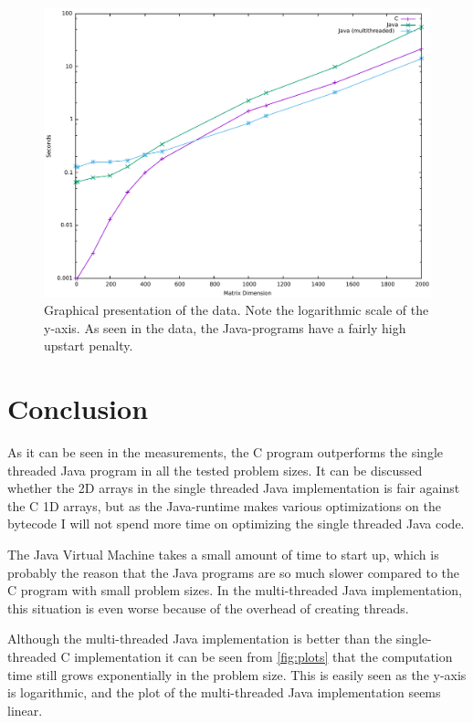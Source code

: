 \documentclass{article}
\begin{document}
	\begin{figure}[H]
		\includegraphics[width=\textwidth]{AppliedAlgorithmsMatrixMultiplicationPlots.pdf}
		\caption{Graphical presentation of the data. Note the logarithmic scale of the y-axis. As seen in the data, the Java-programs have a fairly high upstart penalty.}
		\label{fig:plots}
	\end{figure}

	\section{Conclusion}
	As it can be seen in the measurements, the C program outperforms the single threaded Java program in all the tested problem sizes. It can be discussed whether the 2D arrays in the single threaded Java implementation is fair against the C 1D arrays, but as the Java-runtime makes various optimizations on the bytecode I will not spend more time on optimizing the single threaded Java code.
	
	The Java Virtual Machine takes a small amount of time to start up, which is probably the reason that the Java programs are so much slower compared to the C program with small problem sizes. In the multi-threaded Java implementation, this situation is even worse because of the overhead of creating threads.

	Although the multi-threaded Java implementation is better than the single-threaded C implementation it can be seen from \autoref{fig:plots} that the computation time still grows exponentially in the problem size. This is easily seen as the y-axis is logarithmic, and the plot of the multi-threaded Java implementation seems linear.
\end{document}
